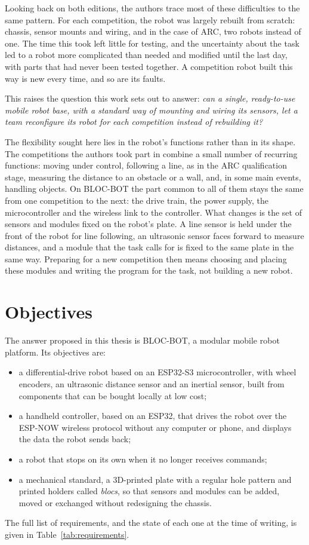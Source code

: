 Looking back on both editions, the authors trace most of these difficulties to the same
pattern. For each competition, the robot was largely rebuilt from scratch: chassis, sensor
mounts and wiring, and in the case of ARC, two robots instead of one. The time this took
left little for testing, and the uncertainty about the task led to a robot more
complicated than needed and modified until the last day, with parts that had never been
tested together. A competition robot built this way is new every time, and so are its
faults.

This raises the question this work sets out to answer: \emph{can a single, ready-to-use
mobile robot base, with a standard way of mounting and wiring its sensors, let a team
reconfigure its robot for each competition instead of rebuilding it?}

The flexibility sought here lies in the robot's functions rather than in its shape. The
competitions the authors took part in combine a small number of recurring functions:
moving under control, following a line, as in the ARC qualification stage, measuring the
distance to an obstacle or a wall, and, in some main events, handling objects. On BLOC-BOT
the part common to all of them stays the same from one competition to the next: the
drive train, the power supply, the microcontroller and the wireless link to the
controller. What changes is the set of sensors and modules fixed on the robot's plate. A
line sensor is held under the front of the robot for line following, an ultrasonic sensor
faces forward to measure distances, and a module that the task calls for is fixed to the
same plate in the same way. Preparing for a new competition then means choosing and
placing these modules and writing the program for the task, not building a new robot.

\section*{Objectives}
The answer proposed in this thesis is BLOC-BOT, a modular mobile robot platform. Its
objectives are:
\begin{itemize}
  \item a differential-drive robot based on an ESP32-S3 microcontroller, with wheel
        encoders, an ultrasonic distance sensor and an inertial sensor, built from
        components that can be bought locally at low cost;
  \item a handheld controller, based on an ESP32, that drives the robot over the ESP-NOW
        wireless protocol without any computer or phone, and displays the data the robot
        sends back;
  \item a robot that stops on its own when it no longer receives commands;
  \item a mechanical standard, a 3D-printed plate with a regular hole pattern and printed
        holders called \emph{blocs}, so that sensors and modules can be added, moved or
        exchanged without redesigning the chassis.
\end{itemize}
The full list of requirements, and the state of each one at the time of writing, is given
in Table~\ref{tab:requirements}.

